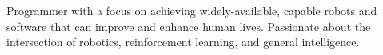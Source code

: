 
Programmer with a focus on achieving widely-available, capable robots and software that can improve and enhance human lives.
Passionate about the intersection of robotics, reinforcement learning, and general intelligence.

